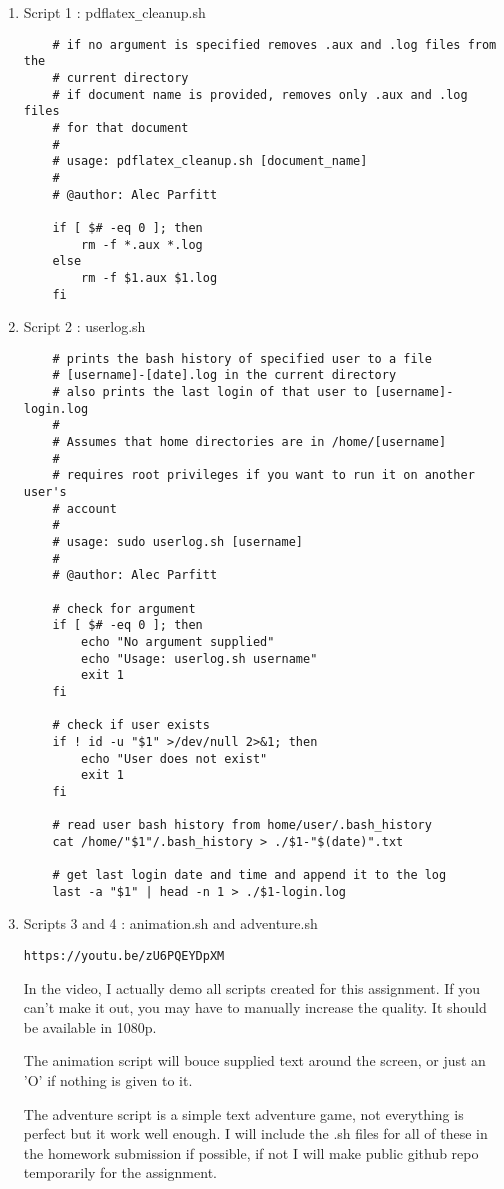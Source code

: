 \documentclass[12pt]{article}
\begin{document}
\begin{enumerate}
\item Script 1 : pdflatex\verb"_"cleanup.sh
\begin{verbatim}
    # if no argument is specified removes .aux and .log files from the 
    # current directory
    # if document name is provided, removes only .aux and .log files 
    # for that document
    #
    # usage: pdflatex_cleanup.sh [document_name]
    #
    # @author: Alec Parfitt
    
    if [ $# -eq 0 ]; then
        rm -f *.aux *.log
    else
        rm -f $1.aux $1.log
    fi
\end{verbatim}
\item Script 2 : userlog.sh
\begin{verbatim}
    # prints the bash history of specified user to a file 
    # [username]-[date].log in the current directory
    # also prints the last login of that user to [username]-login.log
    #
    # Assumes that home directories are in /home/[username]
    #
    # requires root privileges if you want to run it on another user's 
    # account
    #
    # usage: sudo userlog.sh [username]
    #
    # @author: Alec Parfitt

    # check for argument
    if [ $# -eq 0 ]; then
        echo "No argument supplied"
        echo "Usage: userlog.sh username"
        exit 1
    fi

    # check if user exists
    if ! id -u "$1" >/dev/null 2>&1; then
        echo "User does not exist"
        exit 1
    fi

    # read user bash history from home/user/.bash_history
    cat /home/"$1"/.bash_history > ./$1-"$(date)".txt

    # get last login date and time and append it to the log
    last -a "$1" | head -n 1 > ./$1-login.log
\end{verbatim}
\item Scripts 3 and 4 : animation.sh and adventure.sh


\verb"https://youtu.be/zU6PQEYDpXM"

In the video, I actually demo all scripts created for this assignment. If you can't make it out,
you may have to manually increase the quality. It should be available in 1080p.


The animation script will bouce supplied text around the screen, or just an 'O' if nothing is given to it.


The adventure script is a simple text adventure game, not everything is perfect but it work well enough.
I will include the .sh files for all of these in the homework submission if possible, if not I will make
public github repo temporarily for the assignment.
\end{enumerate}
\end{document}
